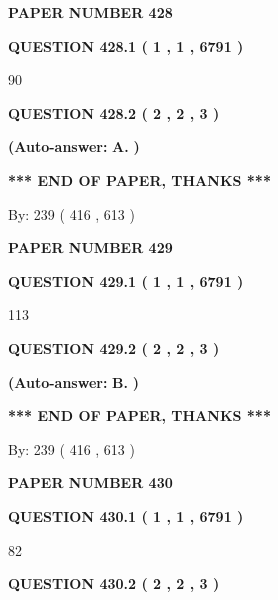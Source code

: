 \documentclass[12pt]{article}
\begin{document}
   
\newpage 
\setcounter{page}{ 
   428001 } 
   
   
 {\textbf{ \Large{ PAPER NUMBER  428  }}}
   
   
   
   
  
  
{\textbf{\large{QUESTION
428.1 
 ( 1 , 1 , 6791 )
}}}

90
  
  
{\textbf{\large{QUESTION
428.2 
 ( 2 , 2 , 3 )
}}}
 
 
{\textbf{(Auto-answer:}}
{\textbf{\large{
A.}}}
{\textbf{)}}
 
 
   
   
   
   
\vspace{1.0in} 
{\textbf{\large{ *** END OF PAPER, THANKS *** }}} 
   
   
\hspace{1.0in} By: 
 239 ( 416 ,  613 )
   
   
   
   
\newpage 
\setcounter{page}{ 
   429001 } 
   
   
 {\textbf{ \Large{ PAPER NUMBER  429  }}}
   
   
   
   
  
  
{\textbf{\large{QUESTION
429.1 
 ( 1 , 1 , 6791 )
}}}

113
  
  
{\textbf{\large{QUESTION
429.2 
 ( 2 , 2 , 3 )
}}}
 
 
{\textbf{(Auto-answer:}}
{\textbf{\large{
B.}}}
{\textbf{)}}
 
 
   
   
   
   
\vspace{1.0in} 
{\textbf{\large{ *** END OF PAPER, THANKS *** }}} 
   
   
\hspace{1.0in} By: 
 239 ( 416 ,  613 )
   
   
   
   
\newpage 
\setcounter{page}{ 
   430001 } 
   
   
 {\textbf{ \Large{ PAPER NUMBER  430  }}}
   
   
   
   
  
  
{\textbf{\large{QUESTION
430.1 
 ( 1 , 1 , 6791 )
}}}

82
  
  
{\textbf{\large{QUESTION
430.2 
 ( 2 , 2 , 3 )
}}}
 
\end{document}
